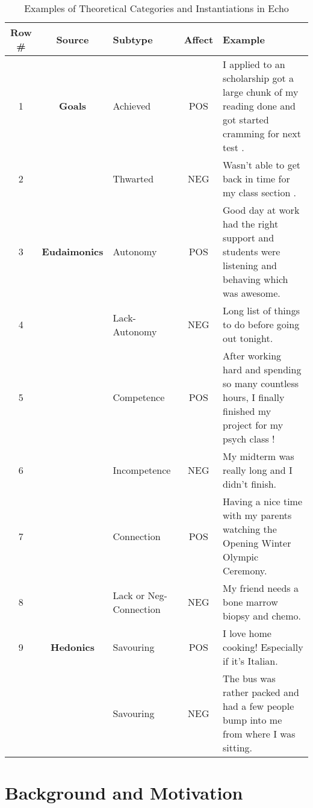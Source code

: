 \documentclass[11pt,letterpaper]{article}
\begin{document}
\begin{table*}[ht!]
\begin{small}
\centering
\begin{tabular}{c|c|l|c|p{2.75in}}
\toprule
Row \# & \bf Source  & \bf Subtype & \bf Affect  & \bf Example  \\
\midrule
1 & \bf Goals & Achieved & POS & I applied to an scholarship got a large chunk of my reading done and got started cramming for next test .\\
2 &       & Thwarted & NEG & Wasn't able to get back in time for my class section .\\
\midrule
3 & \bf Eudaimonics & Autonomy  & POS & Good day at work had the right support and students were listening and behaving which was awesome. \\
4 &             & Lack-Autonomy  & NEG & Long list of things to do before going out tonight. \\
5 &             & Competence & POS & After working hard and spending so many countless hours, I finally finished my project for my psych class ! \\
6 &            & Incompetence & NEG & My midterm was really long and I didn't finish. \\
7 &             & Connection & POS & Having a nice time with my parents watching the Opening Winter Olympic Ceremony.\\
8 &             & Lack or Neg-Connection & NEG & My friend needs a bone marrow biopsy and chemo. \\
\midrule
9 & \bf Hedonics  & Savouring  & POS &  I love home cooking! Especially if it's Italian. \\
  &                & Savouring  & NEG &  The bus was rather packed and had a few people bump into me from where I was sitting. \\
\bottomrule
\end{tabular}
\end{small}
\caption{\label{theory-examp} Examples of Theoretical Categories and Instantiations in {\sc Echo}}
\end{table*}

\section{Background and Motivation}
\label{theory-sec}
\end{document}
